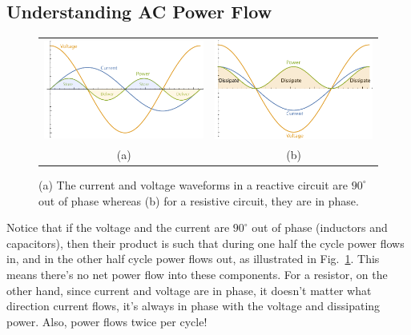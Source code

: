 \subsection{Understanding AC Power Flow}
\begin{figure}[tb]
\begin{center}
\begin{tabular}{cc}
\includegraphics[width=.5\columnwidth]{cap_power} &
\includegraphics[width=.5\columnwidth]{res_power} \\
(a) & (b) \\
\end{tabular}
\end{center}
\caption{(a) The current and voltage waveforms in a reactive circuit are $90^\circ$ out of phase whereas (b) for a resistive circuit, they are in phase.}
\label{fig:powerflow}
\end{figure}
Notice that if the voltage and the current are $90^\circ$ out of phase (inductors and capacitors), then their product is such that during one half the cycle power flows in, and in the other half cycle power flows out, as illustrated in Fig.~\ref{fig:powerflow}.  This means there's no net power flow into these components.  For a resistor, on the other hand, since current and voltage are in phase, it doesn't matter what direction current flows, it's always in phase with the voltage and dissipating power.  Also, power flows twice per cycle!
